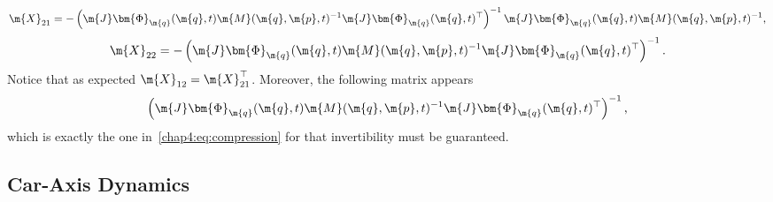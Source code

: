 \begin{equation*}
  \m{X}_{21} = -\left(\m{J}\bm{\Phi}_{\m{q}}(\m{q}, t) \m{M}(\m{q}, \m{p}, t)^{-1}\m{J}\bm{\Phi}_{\m{q}}(\m{q}, t)^{\top}\right)^{-1} \m{J}\bm{\Phi}_{\m{q}}(\m{q}, t)\m{M}(\m{q}, \m{p}, t)^{-1} \text{,}
\end{equation*}
\begin{equation*}
  \m{X}_{22} = -\left(\m{J}\bm{\Phi}_{\m{q}}(\m{q}, t) \m{M}(\m{q}, \m{p}, t)^{-1}\m{J}\bm{\Phi}_{\m{q}}(\m{q}, t)^{\top}\right)^{-1} \text{.}
\end{equation*}
%
Notice that as expected $\m{X}_{12} = \m{X}_{21}^{\top}$. Moreover, the following matrix appears
%
\begin{equation*}
  \left(\m{J}\bm{\Phi}_{\m{q}}(\m{q}, t)\m{M}(\m{q}, \m{p}, t)^{-1} \m{J}\bm{\Phi}_{\m{q}}(\m{q}, t)^{\top}\right)^{-1} \text{,}
\end{equation*}
%
which is exactly the one in~\eqref{chap4:eq:compression} for that invertibility must be guaranteed.

\subsection{Car-Axis Dynamics}

